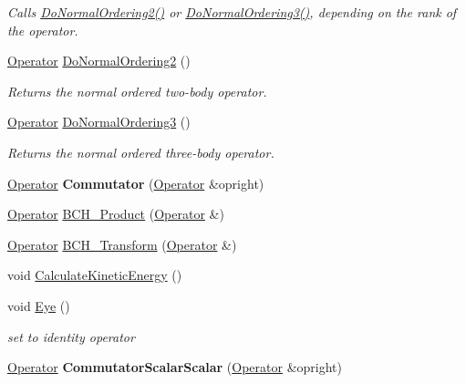 \begin{DoxyCompactItemize}
\begin{DoxyCompactList}\small\item\em Calls \hyperlink{classOperator_a652d989590422a2b26e662625b07254e}{Do\-Normal\-Ordering2()} or \hyperlink{classOperator_a7fd029569796107c87ff17c5a7912480}{Do\-Normal\-Ordering3()}, depending on the rank of the operator. \end{DoxyCompactList}\item 
\hyperlink{classOperator}{Operator} \hyperlink{classOperator_a652d989590422a2b26e662625b07254e}{Do\-Normal\-Ordering2} ()
\begin{DoxyCompactList}\small\item\em Returns the normal ordered two-\/body operator. \end{DoxyCompactList}\item 
\hyperlink{classOperator}{Operator} \hyperlink{classOperator_a7fd029569796107c87ff17c5a7912480}{Do\-Normal\-Ordering3} ()
\begin{DoxyCompactList}\small\item\em Returns the normal ordered three-\/body operator. \end{DoxyCompactList}\item 
\hypertarget{classOperator_a9d78ca5fd265cf4ccc6cda81d35cb086}{\hyperlink{classOperator}{Operator} {\bfseries Commutator} (\hyperlink{classOperator}{Operator} \&opright)}\label{classOperator_a9d78ca5fd265cf4ccc6cda81d35cb086}

\item 
\hyperlink{classOperator}{Operator} \hyperlink{classOperator_a6a91cd02db723ee28b7532e6af029033}{B\-C\-H\-\_\-\-Product} (\hyperlink{classOperator}{Operator} \&)
\item 
\hyperlink{classOperator}{Operator} \hyperlink{classOperator_adc5537604f6b71121163370aca79dfef}{B\-C\-H\-\_\-\-Transform} (\hyperlink{classOperator}{Operator} \&)
\item 
void \hyperlink{classOperator_a701c64f8be794e89fd28a643b56d534a}{Calculate\-Kinetic\-Energy} ()
\item 
\hypertarget{classOperator_a03a378f0da2fe71d8160bd3262891457}{void \hyperlink{classOperator_a03a378f0da2fe71d8160bd3262891457}{Eye} ()}\label{classOperator_a03a378f0da2fe71d8160bd3262891457}

\begin{DoxyCompactList}\small\item\em set to identity operator \end{DoxyCompactList}\item 
\hypertarget{classOperator_a55b95477ad8674877eb4d15491cfe9a0}{\hyperlink{classOperator}{Operator} {\bfseries Commutator\-Scalar\-Scalar} (\hyperlink{classOperator}{Operator} \&opright)}\label{classOperator_a55b95477ad8674877eb4d15491cfe9a0}


\end{DoxyCompactItemize}
